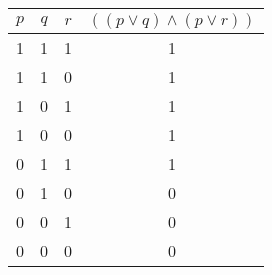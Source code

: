 \begin{tabular}{|c|c|c||c|}
\hline
$ p $ & $ q $ & $ r $ & $ ((p \vee q) \wedge (p \vee r)) $ \\
\hline
1 & 1 & 1 & 1 \\
1 & 1 & 0 & 1 \\
1 & 0 & 1 & 1 \\
1 & 0 & 0 & 1 \\
0 & 1 & 1 & 1 \\
0 & 1 & 0 & 0 \\
0 & 0 & 1 & 0 \\
0 & 0 & 0 & 0 \\
\hline
\end{tabular}
